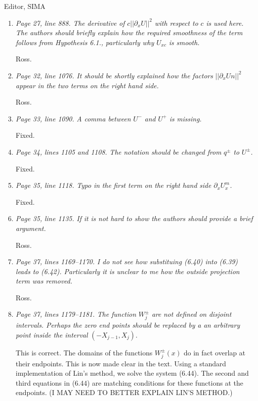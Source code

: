 \documentclass[11pt]{letter}
\begin{document}
\begin{letter}{Editor, SIMA}
\begin{enumerate}
\item \emph{Page 27, line 888. The derivative of $c||\partial_x U||^2$ with respect to $c$ is used here. The authors should briefly explain how the required smoothness of the term follows from Hypothesis 6.1., particularly why $U_{xc}$ is smooth.}
\vspace{4mm}

Ross.

\item \emph{Page 32, line 1076. It should be shortly explained how the factors $||\partial_x Un||^2$ appear in the two terms on the right hand side.}
\vspace{4mm}

Ross.

\item \emph{Page 33, line 1090. A comma between $U^-$ and $U^+$ is missing.}
\vspace{4mm}

Fixed.

\item \emph{Page 34, lines 1105 and 1108. The notation should be changed from $q^\pm$ to $U^\pm$.}
\vspace{4mm}

Fixed.

\item \emph{Page 35, line 1118. Typo in the first term on the right hand side $\partial_x U_x^m$.}
\vspace{4mm}

Fixed.

\item \emph{Page 35, line 1135. If it is not hard to show the authors should provide a brief argument.}
\vspace{4mm}

Ross.

\item \emph{Page 37, lines 1169–1170. I do not see how substituing (6.40) into (6.39) leads to (6.42). Particularly it is unclear to me how the outside projection term was removed.}
\vspace{4mm}

Ross.

\item \emph{Page 37, lines 1179–1181. The function $W_j^\pm$ are not defined on disjoint intervals. Perhaps the zero end points should be replaced by a an arbitrary point inside the interval $(-X_{j-1},X_j)$.}
\vspace{4mm}

This is correct. The domains of the functions $W_j^\pm(x)$ do in fact overlap at their endpoints. This is now made clear in the text. Using a standard implementation of Lin's method, we solve the system (6.44). The second and third equations in (6.44) are matching conditions for these functions at the endpoints. (I MAY NEED TO BETTER EXPLAIN LIN'S METHOD.)


\end{enumerate}
\end{letter}
\end{document}
